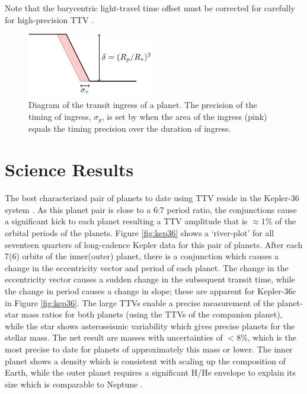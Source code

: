 \documentclass[graybox,natbib,nosecnum]{svmult}
\begin{document}
Note that the barycentric light-travel time offset must be corrected for carefully for high-precision
TTV \citep{2010PASP..122..935E}.

\begin{figure}
\centerline{
\includegraphics[width=0.5\textwidth]{ingress.pdf}}
%
\caption{Diagram of the transit ingress of a planet.  The precision of the timing of ingress, $\sigma_g$, is set by
when the area of the ingress (pink) equals the timing precision over the duration of ingress.}
\label{fig:ingress}       %
\end{figure}


\section{Science Results}

The best characterized pair of planets to date using TTV reside in the Kepler-36 system \citep{2012Sci...337..556C}.  As this planet pair is close to a 6:7 period ratio, the conjunctions cause a significant kick to each planet resulting a TTV amplitude that is $\approx 1$\% of the orbital periods of the planets.  Figure \ref{fig:kep36} shows a `river-plot' for all seventeen quarters of long-cadence Kepler data for this pair of planets.  After each 7(6) orbits of the inner(outer) planet, there is a conjunction which causes a change in the eccentricity vector and period of each planet.  The change in the eccentricity vector causes a sudden change in the subsequent transit time, while the change in period causes a change in slope;  these are apparent for Kepler-36c in Figure \ref{fig:kep36}.  The large TTVs enable a precise measurement of the planet-star mass ratios for both planets (using the TTVs of the companion planet), while the star shows asteroseismic variability which gives precise planets for the stellar mass.   The net result are masses with uncertainties of $<8$\%, which is the most precise to date for planets of approximately this mass or lower.  The inner planet shows a density which is consistent with scaling up the composition of Earth, while the outer planet requires a significant H/He envelope to explain its size which is comparable to Neptune \citep{2012Sci...337..556C}.
\end{document}
